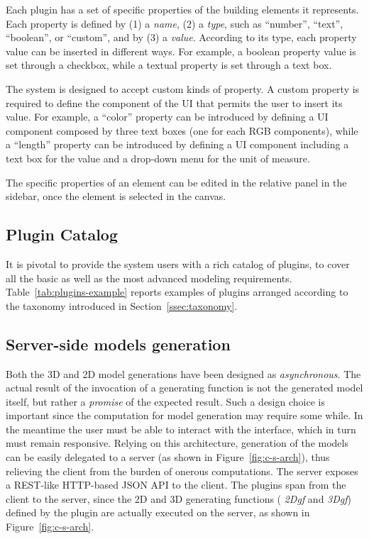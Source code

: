 \documentclass[a4paper,twoside]{article}
\begin{document}
\noindent
Each plugin has a set of specific properties of the building elements it represents.
Each property is defined by (1) a \emph{name}, (2) a \emph{type}, such as ``number'', ``text'', ``boolean'', or ``custom'', and by  (3) a \emph{value}.
According to its type, each property value can be inserted in different ways.
For example, a boolean property value is set through a checkbox, while a textual property is set through a text box.

The system is designed to accept custom kinds of property. A custom property is required to define the component of the UI that permits the user to insert its value.
For example, a ``color'' property can be introduced by defining a UI component composed by three text boxes (one for each RGB components), while a ``length'' property can be introduced by defining a UI component including a text box for the value and a drop-down menu for the unit of measure.

The specific properties of an element can be edited in the relative panel in the sidebar, once the element is selected in the canvas.

\subsection{Plugin Catalog}

\noindent
It is pivotal to provide the system users with a rich catalog of plugins, to cover all the basic as well as the most advanced modeling requirements. Table~\ref{tab:plugins-example} reports examples of plugins arranged according to the  taxonomy introduced in Section~\ref{ssec:taxonomy}.

\subsection{Server-side models generation}

\noindent
Both the 3D and 2D model generations have been designed as \emph{asynchronous}. The actual result of the invocation of a generating function is not the generated model itself, but rather a \emph{promise} of the expected result. Such a design choice is important since the computation for model generation may require some while. In the meantime the user must be able to interact with the interface, which in turn must remain responsive. Relying on this architecture, generation of the models can be easily delegated to a server (as shown in Figure~\ref{fig:c-s-arch}), thus relieving the client from the burden of onerous computations. The server exposes a REST-like HTTP-based JSON API to the client. The plugins span from the client to the server, since the 2D and 3D generating functions ( \emph{2Dgf} and \emph{3Dgf}) defined by the plugin are actually executed on the server, as shown in Figure~\ref{fig:c-s-arch}.
\end{document}
